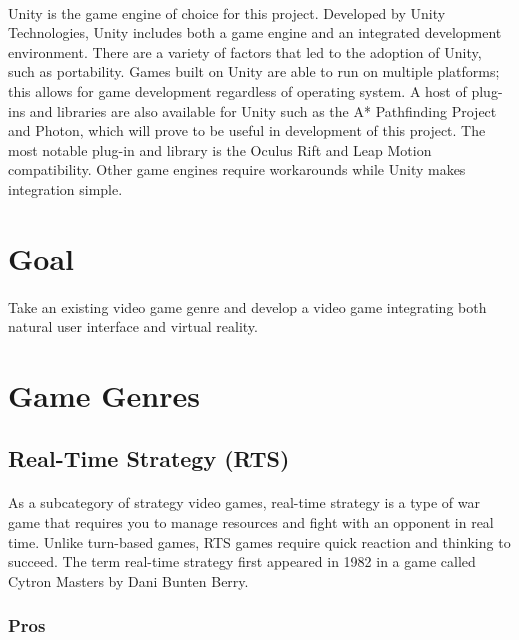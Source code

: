 \paragraph{} Unity is the game engine of choice for this project. Developed by Unity Technologies, Unity includes both a game engine and an integrated development environment. There are a variety of factors that led to the adoption of Unity, such as portability. Games built on Unity are able to run on multiple platforms; this allows for game development regardless of operating system. A host of plug-ins and libraries are also available for Unity such as the A* Pathfinding Project and Photon, which will prove to be useful in development of this project. The most notable plug-in and library is the Oculus Rift and Leap Motion compatibility. Other game engines require workarounds while Unity makes integration simple. 

\section{Goal}

\paragraph{} Take an existing video game genre and develop a video game integrating both natural user interface and virtual reality.

\section{Game Genres}

\subsection{Real-Time Strategy (RTS)}

\paragraph{} As a subcategory of strategy video games, real-time strategy is a type of war game that requires you to manage resources and fight with an opponent in real time. Unlike turn-based games, RTS games require quick reaction and thinking to succeed. The term real-time strategy first appeared in 1982 in a game called Cytron Masters by Dani Bunten Berry. 

\subsubsection{Pros}

